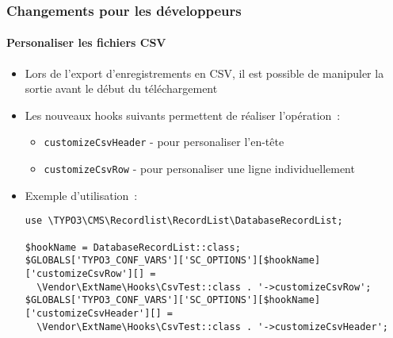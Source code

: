 
\begin{frame}[fragile]
	\frametitle{Changements pour les développeurs}
	\framesubtitle{Personaliser les fichiers CSV}

	\lstset{basicstyle=\tiny\ttfamily}

	\begin{itemize}
		\item Lors de l'export d'enregistrements en CSV, il est possible de manipuler
			la sortie avant le début du téléchargement
		\item Les nouveaux hooks suivants permettent de réaliser l'opération~:

			\begin{itemize}
			\smaller
				\item \texttt{customizeCsvHeader} - pour personaliser l'en-tête
				\item \texttt{customizeCsvRow} - pour personaliser une ligne individuellement
			\end{itemize}

		\item Exemple d'utilisation~:

			\begin{lstlisting}
use \TYPO3\CMS\Recordlist\RecordList\DatabaseRecordList;

$hookName = DatabaseRecordList::class;
$GLOBALS['TYPO3_CONF_VARS']['SC_OPTIONS'][$hookName]['customizeCsvRow'][] =
  \Vendor\ExtName\Hooks\CsvTest::class . '->customizeCsvRow';
$GLOBALS['TYPO3_CONF_VARS']['SC_OPTIONS'][$hookName]['customizeCsvHeader'][] =
  \Vendor\ExtName\Hooks\CsvTest::class . '->customizeCsvHeader';
\end{lstlisting}

	\end{itemize}

\end{frame}


